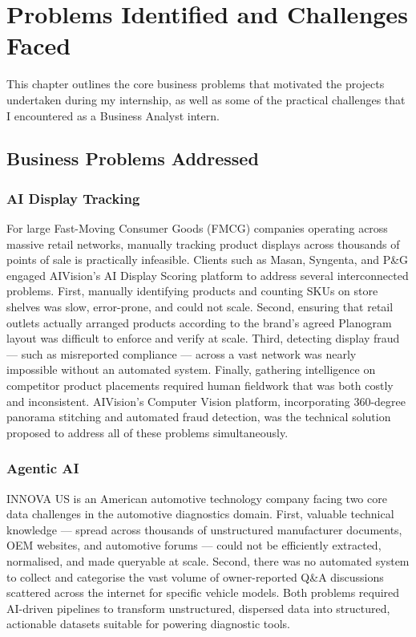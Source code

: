 \chapter{Problems Identified and Challenges Faced}
\label{chap:problems}

This chapter outlines the core business problems that motivated the projects undertaken during my internship, as well as some of the practical challenges that I encountered as a Business Analyst intern.

\section{Business Problems Addressed}

\subsection{AI Display Tracking}

For large Fast-Moving Consumer Goods (FMCG) companies operating across massive retail networks, manually tracking product displays across thousands of points of sale is practically infeasible. Clients such as Masan, Syngenta, and P\&G engaged AIVision's AI Display Scoring platform to address several interconnected problems. First, manually identifying products and counting SKUs on store shelves was slow, error-prone, and could not scale. Second, ensuring that retail outlets actually arranged products according to the brand's agreed Planogram layout was difficult to enforce and verify at scale. Third, detecting display fraud — such as misreported compliance — across a vast network was nearly impossible without an automated system. Finally, gathering intelligence on competitor product placements required human fieldwork that was both costly and inconsistent. AIVision's Computer Vision platform, incorporating 360-degree panorama stitching and automated fraud detection, was the technical solution proposed to address all of these problems simultaneously.

\subsection{Agentic AI}

INNOVA US is an American automotive technology company facing two core data challenges in the automotive diagnostics domain. First, valuable technical knowledge — spread across thousands of unstructured manufacturer documents, OEM websites, and automotive forums — could not be efficiently extracted, normalised, and made queryable at scale. Second, there was no automated system to collect and categorise the vast volume of owner-reported Q\&A discussions scattered across the internet for specific vehicle models. Both problems required AI-driven pipelines to transform unstructured, dispersed data into structured, actionable datasets suitable for powering diagnostic tools.

